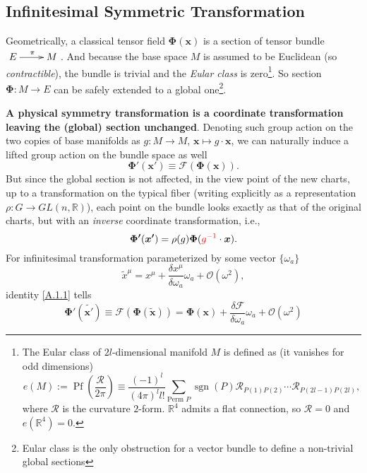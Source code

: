 \documentclass[10pt,nofootinbib]{revtex4}
\begin{document}
	\subsection{Infinitesimal Symmetric Transformation}
		Geometrically, a classical tensor field $\bm{\Phi}(\bm{x})$ is a section of tensor bundle $\xymatrix{E\ar[r]^\pi & M}$. And because the base space $M$ is assumed to be Euclidean (so \emph{contractible}), the bundle is trivial and the \emph{Eular class} is zero\footnote{The Eular class of $2l$-dimensional manifold $M$ is defined as (it vanishes for odd dimensions) \begin{equation*}
			e(M):=\mathop{\mathrm{Pf}}\left(\dfrac{\mathcal{R}}{2\pi}\right)\equiv\dfrac{(-1)^l}{(4\pi)^l l!}\sum_{\text{Perm }P}\mathop{\mathrm{sgn}}(P)\mathcal{R}_{P(1)P(2)}\cdots\mathcal{R}_{P(2l-1)P(2l)},
		\end{equation*}
		where $\mathcal{R}$ is the curvature $2$-form. $\mathbb{R}^4$ admits a flat connection, so $\mathcal{R}=0$ and $e(\mathbb{R}^4)=0$.}. So section $\bm{\Phi}:M\rightarrow E$ can be safely extended to a global one\footnote{Eular class is the only obstruction for a vector bundle to define a non-trivial global sections}. \par
		\textbf{A physical symmetry transformation is a coordinate transformation leaving the (global) section unchanged}. Denoting such group action on the two copies of base manifolds as $g:M\rightarrow M$, $\bm{x}\mapsto g\cdot\bm{x}$, we can naturally induce a lifted group action on the bundle space as well
		\begin{equation}\label{A.1.1}
			\bm{\Phi'}(\bm{x'})\equiv \mathscr{F}(\bm{\Phi}(\bm{x})).
		\end{equation}
		But since the global section is not affected, in the view point of the new charts, up to a transformation on the typical fiber (writing explicitly as a representation $\rho:G\rightarrow GL(n,\mathbb{R})$), each point on the bundle looks exactly as that of the original charts, but with an \emph{inverse} coordinate transformation, i.e., 
		\begin{equation}\label{A.1.2}
			\bm{\Phi'}(\bm{x'})=\rho(g)\bm{\Phi}({\color{red}g^{-1}}\cdot\bm{x}).
		\end{equation}
		\indent For infinitesimal transformation parameterized by some vector $\{\omega_a\}$
		\begin{equation*}
			\widetilde{x} ^\mu=x^\mu+\dfrac{\delta x^\mu}{\delta\omega_a}\omega_a+\mathcal{O}(\omega^2),
		\end{equation*}
		identity \eqref{A.1.1} tells
		\begin{equation}\label{A.1.2}
			\bm{\Phi'}(\widetilde{\bm{x'}})\equiv\mathscr{F}(\bm{\Phi}(\widetilde{\bm{x}}))=\bm{\Phi}(\bm{x})+\dfrac{\delta\mathscr{F}}{\delta\omega_a}\omega_a+\mathcal{O}(\omega^2)
		\end{equation}
		
	

\end{document}
